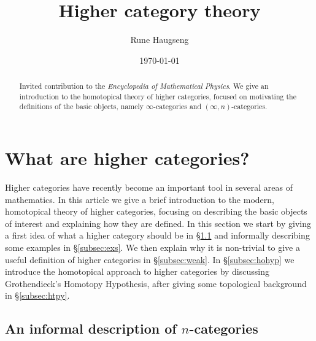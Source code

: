 \documentclass[a4paper,12pt]{article}
\title{Higher category theory}
\author{Rune Haugseng}
\date{\today}
\begin{document}
\maketitle
\begin{abstract}
  Invited contribution to the \emph{Encyclopedia of Mathematical
    Physics}. We give an introduction to the homotopical theory of
  higher categories, focused on motivating the definitions of the
  basic objects, namely $\infty$-categories and
  $(\infty,n)$-categories.
\end{abstract}

\newpage
\tableofcontents
\newpage

\section{What are higher categories?}
Higher categories have recently become an important tool in several
areas of mathematics. In this article we give a brief
introduction to the modern, homotopical theory of higher categories,
focusing on describing the basic objects of interest and explaining
how they are defined. In this section we start by giving a first idea
of what a higher category should be in \S\ref{subsec:ncats} and
informally describing some examples in \S\ref{subsec:exs}. We then
explain why it is non-trivial to give a useful definition of higher
categories in \S\ref{subsec:weak}.  In \S\ref{subsec:hohyp} we
introduce the homotopical approach to higher categories by discussing
Grothendieck's Homotopy Hypothesis, after giving some topological
background in \S\ref{subsec:htpy}.


\subsection{An informal description of $n$-categories}\label{subsec:ncats}
\end{document}
